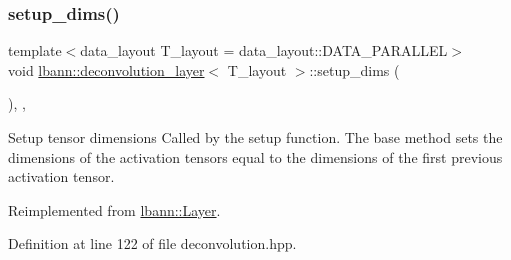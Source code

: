 \subsubsection{\texorpdfstring{setup\+\_\+dims()}{setup\_dims()}}
{\footnotesize\ttfamily template$<$data\+\_\+layout T\+\_\+layout = data\+\_\+layout\+::\+D\+A\+T\+A\+\_\+\+P\+A\+R\+A\+L\+L\+EL$>$ \\
void \hyperlink{classlbann_1_1deconvolution__layer}{lbann\+::deconvolution\+\_\+layer}$<$ T\+\_\+layout $>$\+::setup\+\_\+dims (\begin{DoxyParamCaption}{ }\end{DoxyParamCaption})\hspace{0.3cm}{\ttfamily [inline]}, {\ttfamily [override]}, {\ttfamily [virtual]}}

Setup tensor dimensions Called by the setup function. The base method sets the dimensions of the activation tensors equal to the dimensions of the first previous activation tensor. 

Reimplemented from \hyperlink{classlbann_1_1Layer_a90fce1b06c1f2abb480e18cfe08a9746}{lbann\+::\+Layer}.



Definition at line 122 of file deconvolution.\+hpp.


